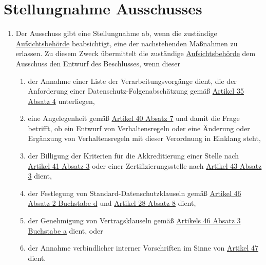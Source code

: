 \chapter{Stellungnahme Ausschusses}
\label{ch:64}


\begin{enumerate}

  \item Der Ausschuss gibt eine Stellungnahme ab, wenn die zuständige \hyperref[itm:04-21]
   {Aufsichtsbehörde} beabsichtigt, eine der nachstehenden Maßnahmen zu erlassen. Zu diesem Zweck übermittelt die
   zuständige \hyperref[itm:04-21]{Aufsichtsbehörde} dem Ausschuss den Entwurf des Beschlusses, wenn dieser
  \label{itm:64-1}

  \begin{enumerate}
  
    \item der Annahme einer Liste der Verarbeitungsvorgänge dient, die der Anforderung einer
     Datenschutz-Folgenabschätzung gemäß \hyperref[itm:35-4]{Artikel 35 Absatz 4} unterliegen,
    \label{itm:64-1a}

    \item eine Angelegenheit gemäß \hyperref[itm:40-7]{Artikel 40 Absatz 7} und damit die Frage betrifft, ob ein Entwurf
     von Verhaltensregeln oder eine Änderung oder Ergänzung von Verhaltensregeln mit dieser Verordnung in Einklang
     steht,
    \label{itm:64-1b}

    \item der Billigung der Kriterien für die Akkreditierung einer Stelle nach \hyperref[itm:41-3]{Artikel 41 Absatz 3}
     oder einer Zertifizierungsstelle nach \hyperref[itm:43-3]{Artikel 43 Absatz 3} dient,
    \label{itm:64-1c}

    \item der Festlegung von Standard-Datenschutzklauseln gemäß \hyperref[itm:46-2d]{Artikel 46 Absatz 2 Buchstabe d}
     und \hyperref[itm:28-8]{Artikel 28 Absatz 8} dient,
    \label{itm:64-1d}

    \item der Genehmigung von Vertragsklauseln gemäß \hyperref[itm:46-3a]{Artikels 46 Absatz 3 Buchstabe a} dient, oder
    \label{itm:64-1e}

    \item der Annahme verbindlicher interner Vorschriften im Sinne von \hyperref[ch:47]{Artikel 47} dient.
    \label{itm:64-1f}


\end{enumerate}
\end{enumerate}
